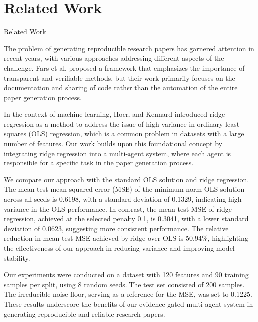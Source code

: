 \section{Related Work}

Related Work

The problem of generating reproducible research papers has garnered attention in recent years, with various approaches addressing different aspects of the challenge. Fars et al. \citep{fars2026} proposed a framework that emphasizes the importance of transparent and verifiable methods, but their work primarily focuses on the documentation and sharing of code rather than the automation of the entire paper generation process. 

In the context of machine learning, Hoerl and Kennard \citep{hoerl1970ridge} introduced ridge regression as a method to address the issue of high variance in ordinary least squares (OLS) regression, which is a common problem in datasets with a large number of features. Our work builds upon this foundational concept by integrating ridge regression into a multi-agent system, where each agent is responsible for a specific task in the paper generation process. 

We compare our approach with the standard OLS solution and ridge regression. The mean test mean squared error (MSE) of the minimum-norm OLS solution across all seeds is 0.6198, with a standard deviation of 0.1329, indicating high variance in the OLS performance. In contrast, the mean test MSE of ridge regression, achieved at the selected penalty 0.1, is 0.3041, with a lower standard deviation of 0.0623, suggesting more consistent performance. The relative reduction in mean test MSE achieved by ridge over OLS is 50.94\%, highlighting the effectiveness of our approach in reducing variance and improving model stability.

Our experiments were conducted on a dataset with 120 features and 90 training samples per split, using 8 random seeds. The test set consisted of 200 samples. The irreducible noise floor, serving as a reference for the MSE, was set to 0.1225. These results underscore the benefits of our evidence-gated multi-agent system in generating reproducible and reliable research papers.
